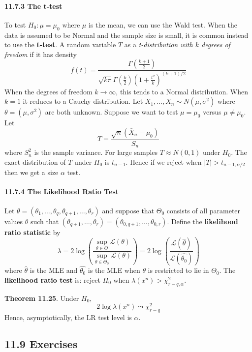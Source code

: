 \paragraph{11.7.3 The t-test}\label{the-t-test}
To test \(H_{0}: \mu = \mu_{0}\) where \(\mu\) is the mean, we can use the
Wald test. When the data is assumed to be Normal and the sample size is
small, it is common instead to use the \textbf{t-test}. A random
variable \(T\) as a \emph{t-distribution with \(k\) degrees of freedom}
if it has density
\[
f(t) = \frac{\Gamma\left(\frac{k+1}{2}\right)}{\sqrt{k \pi} \Gamma\left(\frac{k}{2}\right) \left(1 + \frac{t^{2}}{k}\right)^{(k+1)/2}}
\]
When the degrees of freedom \(k \rightarrow \infty\), this tends to a
Normal distribution. When \(k = 1\) it reduces to a Cauchy distribution.
Let \(X_{1}, \dots, X_{n} \sim N(\mu, \sigma^{2})\) where
\(\theta = (\mu, \sigma^{2})\) are both unknown. Suppose we want to test
\(\mu = \mu_{0}\) versus \(\mu \neq \mu_{0}\). Let
\[
T = \frac{\sqrt{n}(\bar{X}_{n} - \mu_{0})}{S_{n}}
\]
where \(S_{n}^{2}\) is the sample variance. For large samples
\(T \approx N(0, 1)\) under \(H_{0}\). The exact distribution of \(T\)
under \(H_{0}\) is \(t_{n-1}\). Hence if we reject when
\(|T| > t_{n-1, \alpha/2}\) then we get a size \(\alpha\) test.
\paragraph{11.7.4 The Likelihood Ratio
Test}\label{the-likelihood-ratio-test}
Let
\(\theta = (\theta_{1}, \dots, \theta_q, \theta_{q+1}, \dots, \theta_r)\)
and suppose that \(\Theta_{0}\) consists of all parameter values
\(\theta\) such that
\((\theta_{q+1}, \dots, \theta_r) = (\theta_{0, q+1}, \dots, \theta_{0, r})\).
Define the \textbf{likelihood ratio statistic} by
\[
\lambda 
= 2 \log \left(  \frac{\sup_{\theta \in \Theta} \mathcal{L}(\theta)}{\sup_{\theta \in \Theta_{0}} \mathcal{L}(\theta)} \right) 
= 2 \log \left(  \frac{\mathcal{L}(\hat{\theta})}{\mathcal{L}(\hat{\theta_{0}})} \right)
\]
where \(\hat{\theta}\) is the MLE and \(\hat{\theta_{0}}\) is the MLE when
\(\theta\) is restricted to lie in \(\Theta_{0}\).
The \textbf{likelihood ratio test} is: reject \(H_{0}\) when
\(\lambda(x^{n}) > \chi^{2}_{r-q, \alpha}\).

\textbf{Theorem 11.25}. Under \(H_{0}\),
\[
2 \log \lambda (x^{n}) \leadsto \chi^{2}_{r - q}
\]
Hence, asymptotically, the LR test level is \(\alpha\).

\subsection*{11.9 Exercises}

